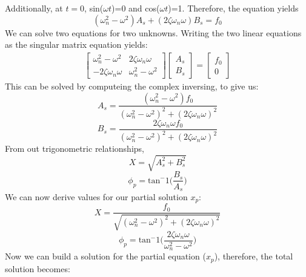 \documentclass[12pt,letter]{article}
\numberwithin{ex}{section} %
\begin{document}
			Additionally, at $t=0$, sin($\omega t$)=0 and cos($\omega t$)=1. Therefore, the equation yields		
			\begin{equation}
				(\omega_n^2 - \omega^2)A_s + (2\zeta \omega_n \omega)B_s = f_0
			\end{equation}				
			We can solve two equations for two unknowns. Writing the two linear equations as the singular matrix equation yields:
			\begin{gather}
			   \begin{bmatrix}
			   \omega_n^2 - \omega^2 & 2\zeta \omega_n \omega \\
			   - 2\zeta \omega_n \omega &  \omega_n^2 - \omega^2
			   \end{bmatrix}
  			   \begin{bmatrix}
  			   A_s \\
  			   B_s
  			   \end{bmatrix}
			 = \begin{bmatrix} f_0 \\ 0
			 \end{bmatrix}
			\end{gather}
			This can be solved by computeing the complex inversing, to give us:
			\begin{equation}
				A_s = \frac{(\omega_n^2 - \omega^2)f_0}{(\omega_n^2 - \omega^2)^2 +  (2\zeta \omega_n \omega)^2}
			\end{equation}	
			\begin{equation}
				B_s = \frac{2\zeta \omega_n \omega f_0}{(\omega_n^2 - \omega^2)^2 +  (2\zeta \omega_n \omega)^2}
			\end{equation}	
			From out trigonometric relationships, 
			\begin{equation}
				X = \sqrt{A_s^2 + B_s^2}
			\end{equation}	
			\begin{equation}
				\phi_p = \text{tan}^-1\bigg(\frac{B_s}{A_s}\bigg)
			\end{equation}	
			We can now derive values for our partial solution $x_p$:
			\begin{equation}
				X = \frac{f_0}{\sqrt{(\omega_n^2 - \omega^2)^2 +  (2\zeta \omega_n \omega)^2}} 
			\end{equation}	
			\begin{equation}
				\phi_p = \text{tan}^-1\bigg(\frac{2\zeta \omega_n \omega}{\omega_n^2 - \omega^2}\bigg)
			\end{equation}				
			Now we can build a solution for the partial equation ($x_p$), therefore, the total solution becomes:
\end{document}
